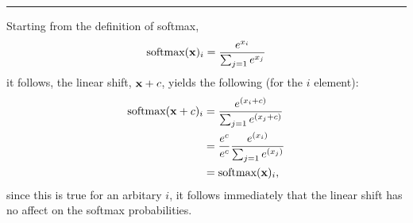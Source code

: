 \noindent\rule{\textwidth}{0.4pt}

\noindent Starting from the definition of softmax,
\begin{equation}
\textrm{softmax}({\bf x})_{i} = \frac{e^{x_{i}}}{\sum_{j=1}{e^{x_{j}}}}
\end{equation}
it follows, the linear shift, ${\bf x} + c$, yields the following (for the $i$ element):
\begin{align}
\textrm{softmax}({\bf x} + c)_{i} & = \frac{e^{(x_{i} + c)}}{\sum_{j=1}{e^{(x_{j} + c)}}}\\
                                                 & = \frac{e^{c}}{e^{c}}\frac{e^{(x_{i})}}{\sum_{j=1}{e^{(x_{j})}}}\\
                                                 & = \textrm{softmax}({\bf x})_{i},\\
\end{align}
since this is true for an arbitary $i$, it follows immediately that the linear shift has no affect on the softmax probabilities.




\clearpage
\pagestyle{myheadings}

